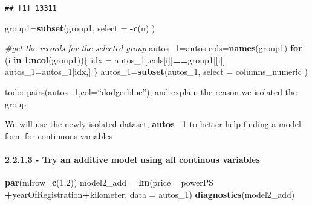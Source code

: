\documentclass[]{article}
\newenvironment{Shaded}{\begin{snugshade}}{\end{snugshade}}
\newcommand{\CommentTok}[1]{\textcolor[rgb]{0.56,0.35,0.01}{\textit{#1}}}
\newcommand{\ControlFlowTok}[1]{\textcolor[rgb]{0.13,0.29,0.53}{\textbf{#1}}}
\newcommand{\DataTypeTok}[1]{\textcolor[rgb]{0.13,0.29,0.53}{#1}}
\newcommand{\DecValTok}[1]{\textcolor[rgb]{0.00,0.00,0.81}{#1}}
\newcommand{\KeywordTok}[1]{\textcolor[rgb]{0.13,0.29,0.53}{\textbf{#1}}}
\newcommand{\NormalTok}[1]{#1}
\newcommand{\OperatorTok}[1]{\textcolor[rgb]{0.81,0.36,0.00}{\textbf{#1}}}
\newcommand{\StringTok}[1]{\textcolor[rgb]{0.31,0.60,0.02}{#1}}
\let\oldparagraph\paragraph
\renewcommand{\paragraph}[1]{\oldparagraph{#1}\mbox{}}
\begin{document}
\begin{Shaded}
\end{Shaded}

\begin{verbatim}
## [1] 13311
\end{verbatim}

\begin{Shaded}
\begin{Highlighting}[]
\NormalTok{group1=}\KeywordTok{subset}\NormalTok{(group1, }\DataTypeTok{select =} \OperatorTok{-}\KeywordTok{c}\NormalTok{(n) )}

\CommentTok{#get the records for the selected group}
\NormalTok{autos_}\DecValTok{1}\NormalTok{=autos}
\NormalTok{cols=}\KeywordTok{names}\NormalTok{(group1)}
\ControlFlowTok{for}\NormalTok{ (i }\ControlFlowTok{in} \DecValTok{1}\OperatorTok{:}\KeywordTok{ncol}\NormalTok{(group1))\{}
\NormalTok{  idx =}\StringTok{ }\NormalTok{autos_}\DecValTok{1}\NormalTok{[,cols[i]]}\OperatorTok{==}\NormalTok{group1[[i]]}
\NormalTok{  autos_}\DecValTok{1}\NormalTok{=autos_}\DecValTok{1}\NormalTok{[idx,]}
\NormalTok{\}}
\NormalTok{autos_}\DecValTok{1}\NormalTok{=}\KeywordTok{subset}\NormalTok{(autos_}\DecValTok{1}\NormalTok{, }\DataTypeTok{select =}\NormalTok{ columns_numeric )}
\end{Highlighting}
\end{Shaded}

todo: pairs(autos\_1,col=``dodgerblue''), and explain the reason we
isolated the group

We will use the newly isolated dataset, \textbf{autos\_1} to better help
finding a model form for continuous variables

\hypertarget{try-an-additive-model-using-all-continous-variables}{%
\paragraph{2.2.1.3 - Try an additive model using all continous
variables}\label{try-an-additive-model-using-all-continous-variables}}

\begin{Shaded}
\begin{Highlighting}[]
\KeywordTok{par}\NormalTok{(}\DataTypeTok{mfrow=}\KeywordTok{c}\NormalTok{(}\DecValTok{1}\NormalTok{,}\DecValTok{2}\NormalTok{))}
\NormalTok{model2_add =}\StringTok{ }\KeywordTok{lm}\NormalTok{(price }\OperatorTok{~}\StringTok{ }\NormalTok{powerPS }\OperatorTok{+}\NormalTok{yearOfRegistration}\OperatorTok{+}\NormalTok{kilometer, }\DataTypeTok{data =}\NormalTok{ autos_}\DecValTok{1}\NormalTok{)}
\KeywordTok{diagnostics}\NormalTok{(model2_add)}
\end{Highlighting}
\end{Shaded}
\end{document}
